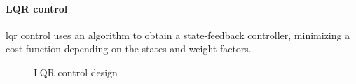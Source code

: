
\paragraph{LQR control}
\acf{lqr} control uses an algorithm to obtain a state-feedback controller, minimizing a cost function depending on the states and weight factors. 
\begin{figure}[h!]
	\centering
	\caption{LQR control design\label{fig:set.lqr}}
\end{figure}

